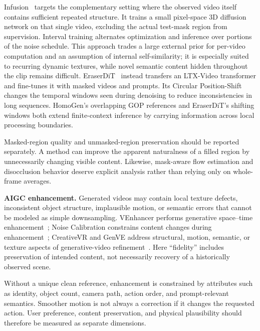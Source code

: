 Infusion~\cite{infusion} targets the complementary setting where the observed video itself contains sufficient repeated structure. It trains a small pixel-space 3D diffusion network on that single video, excluding the actual test-mask region from supervision. Interval training alternates optimization and inference over portions of the noise schedule. This approach trades a large external prior for per-video computation and an assumption of internal self-similarity; it is especially suited to recurring dynamic textures, while novel semantic content hidden throughout the clip remains difficult. EraserDiT~\cite{eraserdit} instead transfers an LTX-Video transformer and fine-tunes it with masked videos and prompts. Its Circular Position-Shift changes the temporal windows seen during denoising to reduce inconsistencies in long sequences. HomoGen's overlapping GOP references and EraserDiT's shifting windows both extend finite-context inference by carrying information across local processing boundaries.

Masked-region quality and unmasked-region preservation should be reported separately. A method can improve the apparent naturalness of a filled region by unnecessarily changing visible content. Likewise, mask-aware flow estimation and disocclusion behavior deserve explicit analysis rather than relying only on whole-frame averages.

\textbf{AIGC enhancement.} Generated videos may contain local texture defects, inconsistent object structure, implausible motion, or semantic errors that cannot be modeled as simple downsampling. VEnhancer performs generative space--time enhancement~\cite{venhancer}; Noise Calibration constrains content changes during enhancement~\cite{ncsdedit}; CreativeVR and GenVE address structural, motion, semantic, or texture aspects of generative-video refinement~\cite{creativevr,genve}. Here ``fidelity'' includes preservation of intended content, not necessarily recovery of a historically observed scene.

Without a unique clean reference, enhancement is constrained by attributes such as identity, object count, camera path, action order, and prompt-relevant semantics. Smoother motion is not always a correction if it changes the requested action. User preference, content preservation, and physical plausibility should therefore be measured as separate dimensions.

